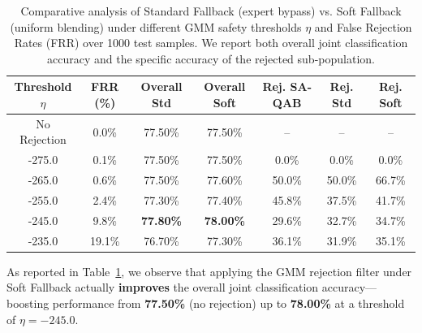 \documentclass{article}
\theoremstyle{plain}
\theoremstyle{definition}
\theoremstyle{remark}
\begin{document}
\begin{table}[h]
\caption{Comparative analysis of Standard Fallback (expert bypass) vs. Soft Fallback (uniform blending) under different GMM safety thresholds $\eta$ and False Rejection Rates (FRR) over 1000 test samples. We report both overall joint classification accuracy and the specific accuracy of the rejected sub-population.}
\label{tab:fallback_policies_app}
\vskip 0.15in
\begin{center}
\begin{small}
\begin{sc}
\setlength{\tabcolsep}{6pt}
\begin{tabular}{ccccccc}
\toprule
Threshold $\eta$ & FRR (\%) & Overall Std & Overall Soft & Rej. SA-QAB & Rej. Std & Rej. Soft \\
\midrule
No Rejection & 0.0\% & 77.50\% & 77.50\% & -- & -- & -- \\
-275.0 & 0.1\% & 77.50\% & 77.50\% & 0.0\% & 0.0\% & 0.0\% \\
-265.0 & 0.6\% & 77.50\% & 77.60\% & 50.0\% & 50.0\% & 66.7\% \\
-255.0 & 2.4\% & 77.30\% & 77.40\% & 45.8\% & 37.5\% & 41.7\% \\
-245.0 & 9.8\% & \textbf{77.80\%} & \textbf{78.00\%} & 29.6\% & 32.7\% & 34.7\% \\
-235.0 & 19.1\% & 76.70\% & 77.30\% & 36.1\% & 31.9\% & 35.1\% \\
\bottomrule
\end{tabular}
\end{sc}
\end{small}
\end{center}
\vskip -0.1in
\end{table}

As reported in Table~\ref{tab:fallback_policies_app}, we observe that applying the GMM rejection filter under Soft Fallback actually \textbf{improves} the overall joint classification accuracy—boosting performance from \textbf{77.50\%} (no rejection) up to \textbf{78.00\%} at a threshold of $\eta = -245.0$.
\end{document}
